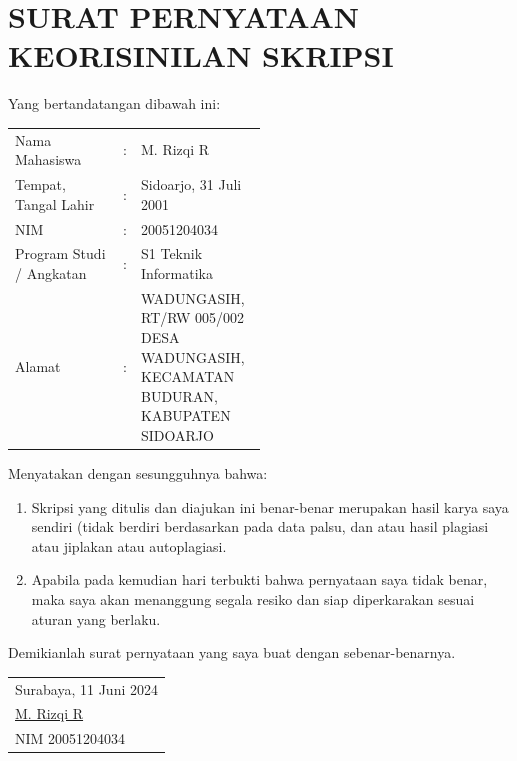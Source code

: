 \documentclass[10pt,twoside]{report}
\begin{document}
\chapter*{SURAT PERNYATAAN KEORISINILAN SKRIPSI}
\begin{adjustwidth}{0pt}{}
	Yang bertandatangan dibawah ini:\\
	\noindent
	\begin{tabular}{@{}lcp{0.5\linewidth}}
		Nama Mahasiswa           & : & M. Rizqi R                                                                                    \\
		Tempat, Tangal Lahir     & : & Sidoarjo, 31 Juli 2001                                                                        \\
		NIM                      & : & 20051204034                                                                                   \\
		Program Studi / Angkatan & : & S1 Teknik Informatika                                                                         \\
		Alamat                   & : & \raggedright WADUNGASIH, RT/RW 005/002 DESA WADUNGASIH, KECAMATAN BUDURAN, KABUPATEN SIDOARJO \\
	\end{tabular}
	\noindent
	Menyatakan dengan sesungguhnya bahwa:
	\begin{enumerate}[nolistsep]
		\item Skripsi yang ditulis dan diajukan ini benar-benar merupakan hasil
		      karya saya sendiri (tidak berdiri berdasarkan pada data palsu, dan atau
		      hasil plagiasi atau jiplakan atau autoplagiasi.
		\item Apabila pada kemudian hari terbukti bahwa pernyataan saya tidak
		      benar, maka saya akan menanggung segala resiko dan siap diperkarakan
		      sesuai aturan yang berlaku.
	\end{enumerate}
	\noindent
	Demikianlah surat pernyataan yang saya buat dengan sebenar-benarnya.
	\vspace{0.5cm}
	\begin{adjustwidth}{170pt}{}
		\begin{tabular}{@{}l}
			Surabaya, 11 Juni 2024
			\vspace{2.2cm}
			\\
			\underline{M. Rizqi R} \\
			NIM 20051204034        \\
		\end{tabular}
	\end{adjustwidth}
\end{adjustwidth}
\end{document}
